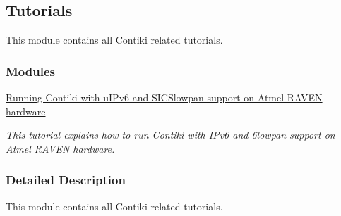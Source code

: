 \hypertarget{a00059}{\subsection{\-Tutorials}
\label{a00059}
}


\-This module contains all \-Contiki related tutorials.  


\subsubsection*{\-Modules}
\begin{DoxyCompactItemize}
\item 
\hyperlink{a00058}{\-Running Contiki with u\-I\-Pv6 and S\-I\-C\-Slowpan support on Atmel R\-A\-V\-E\-N hardware}
\begin{DoxyCompactList}\small\item\em \-This tutorial explains how to run \-Contiki with \-I\-Pv6 and 6lowpan support on \-Atmel \-R\-A\-V\-E\-N hardware. \end{DoxyCompactList}\end{DoxyCompactItemize}


\subsubsection{\-Detailed \-Description}
\-This module contains all \-Contiki related tutorials. 